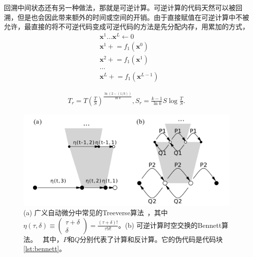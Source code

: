 \documentclass[A4,twoside,fontset=ubuntu,UTF8]{ctexart}
\newcommand{\vx}{{\mathbf{x}}}
\begin{document}
回溯中间状态还有另一种做法，那就是可逆计算。可逆计算的代码天然可以被回溯，但是也会因此带来额外的时间或空间的开销。由于直接赋值在可逆计算中不被允许，最直接的将不可逆代码变成可逆代码的方法是先分配内存，用累加的方式，
\begin{align}
    &\vx^1 \ldots \vx^L \leftarrow 0\\
    &\vx^1 \mathrel{+}= f_1(\vx^0)\\
    &\vx^2 \mathrel{+}= f_1(\vx^1)\\
    &\ldots\\
    &\vx^L \mathrel{+}= f_1(\vx^{L-1})
\end{align}

\begin{align}\label{eq:rev}
    T_r = T\left(\frac{T}{S}\right)^{\frac{\ln(2-(1/k))}{\ln k}}, S_r = \frac{k-1}{\ln k}S\log\frac{T}{S}.
\end{align}

\begin{figure}
    \centerline{\includegraphics[width=0.88\columnwidth,trim={0 0cm 0 0cm},clip]{tradeoff.pdf}}
    \caption{(a) 广义自动微分中常见的Treeverse算法~\cite{Griewank1992}，其中$\eta(\tau, \delta) \equiv \left(\begin{matrix} \tau + \delta \\ \delta \end{matrix}\right)=\frac{(\tau+\delta)!}{\tau!\delta!}$。(b) 可逆计算时空交换的Bennett算法。~\cite{Bennett1973,Levine1990} 其中，$P$和$Q$分别代表了计算和反计算。它的伪代码是代码块\ref{lst:bennett}。}\label{fig:tradeoff}
\end{figure}
\end{document}
